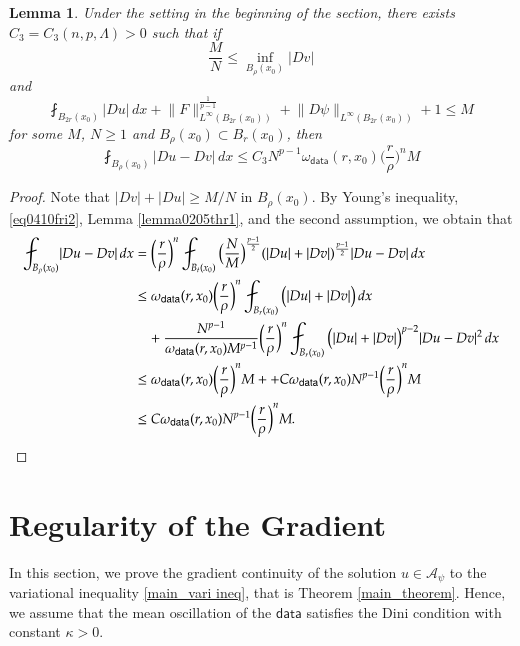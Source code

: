 \documentclass[reqno]{amsart}
\numberwithin{equation}{section}
\theoremstyle{plain}
\newtheorem{lemma}[theorem]{Lemma}
\theoremstyle{definition}
\theoremstyle{remark}
\providecommand{\abs}[1]{\lvert#1\rvert}
\providecommand{\norm}[1]{\lVert#1\rVert}
\begin{document}
\begin{lemma} \label{lemma0327fri1}
Under the setting in the beginning of the section, there exists $C_3=C_3(n,p,\Lambda)>0$ such that if 
\[
\frac{M}{N} \leq \inf_{B_\rho(x_0)}\abs{Dv}  %
\]
and
\[
  \fint_{B_{2r}(x_0)} \abs{Du}\, dx  +   \norm{F}_{L^\infty(B_{2r}(x_0))}
^{\frac{1}{p-1}}+\norm{D\psi}_{L^\infty(B_{2r}(x_0))} +1  \leq M
\]
for some $M$, $N\geq 1$ and $B_\rho(x_0)\subset  B_r(x_0)$, then
\[
 \fint_{B_\rho(x_0)}\abs{Du-Dv}\, dx\leq C_3 N^{p-1}\omega_{\mathsf{data}}(r,x_0)   \bigg(\frac{r}{\rho}\bigg)^n M
\]
\end{lemma}
\begin{proof}
Note that $\abs{Dv}+\abs{Du}\geq M/N$ in $B_\rho(x_0)$. By Young's inequality, \eqref{eq0410fri2}, Lemma \ref{lemma0205thr1}, and the second assumption, we obtain that
\begin{align*}
\fint_{B_\rho(x_0)}\abs{Du-Dv}  \, dx&= 
\bigg(\frac{r}{\rho}\bigg)^n   \fint_{B_t(x_0)}\big(\frac{N}{M}\big)^{\frac{p-1}{2}}(|Du|+|Dv|)^{\frac{p-1}{2}}\abs{Du-Dv}  \, dx\\
& \leq  \omega_{\mathsf{data}}(r,x_0)\bigg(\frac{r}{\rho}\bigg)^n  \fint_{B_r(x_0)} \big(\abs{Du}+\abs{Dv}\big)\,  dx\\
&\quad +\frac{N^{p-1}}{\omega_{\mathsf{data} } (r,x_0) M^{p-1}} \bigg(\frac{r}{\rho}\bigg)^n \fint_{B_r(x_0)}\big(\abs{Du}+\abs{Dv}\big)^{p-2}\abs{Du-Dv}^{2}\, dx\\
&\leq  \omega_{\mathsf{data}}(r,x_0) \bigg(\frac{r}{\rho}\bigg)^n  M+
+C \omega_{\mathsf{data}}(r,x_0) N^{p-1}  \bigg(\frac{r}{\rho}\bigg)^n M\\
&\leq C \omega_{\mathsf{data}}(r,x_0) N^{p-1}  \bigg(\frac{r}{\rho}\bigg)^n M. \qedhere
\end{align*}
 
\end{proof} 

\section{Regularity of the Gradient}  \label{sec4}



In this section, we prove the gradient continuity of the solution $u\in \mathcal{A}_\psi$ to the variational inequality \eqref{main_vari ineq}, that is Theorem \ref{main_theorem}. Hence, we assume that the mean oscillation of the $\mathsf{data}$ satisfies the Dini condition with constant $\kappa>0$. 
 
\end{document}
